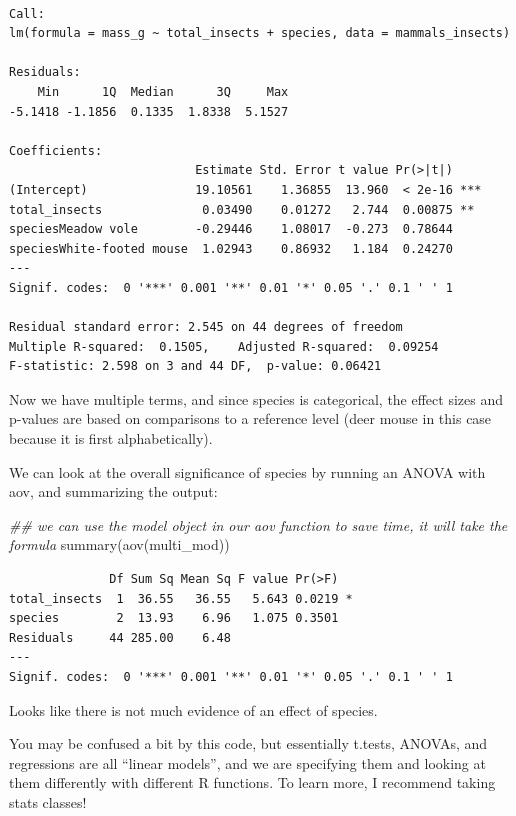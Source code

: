 \documentclass[
  letterpaper,
  DIV=11,
  numbers=noendperiod]{scrreprt}
\newenvironment{Shaded}{\begin{snugshade}}{\end{snugshade}}
\newcommand{\DocumentationTok}[1]{\textcolor[rgb]{0.37,0.37,0.37}{\textit{#1}}}
\newcommand{\FunctionTok}[1]{\textcolor[rgb]{0.28,0.35,0.67}{#1}}
\newcommand{\NormalTok}[1]{\textcolor[rgb]{0.00,0.23,0.31}{#1}}
\begin{document}
\begin{verbatim}

Call:
lm(formula = mass_g ~ total_insects + species, data = mammals_insects)

Residuals:
    Min      1Q  Median      3Q     Max 
-5.1418 -1.1856  0.1335  1.8338  5.1527 

Coefficients:
                          Estimate Std. Error t value Pr(>|t|)    
(Intercept)               19.10561    1.36855  13.960  < 2e-16 ***
total_insects              0.03490    0.01272   2.744  0.00875 ** 
speciesMeadow vole        -0.29446    1.08017  -0.273  0.78644    
speciesWhite-footed mouse  1.02943    0.86932   1.184  0.24270    
---
Signif. codes:  0 '***' 0.001 '**' 0.01 '*' 0.05 '.' 0.1 ' ' 1

Residual standard error: 2.545 on 44 degrees of freedom
Multiple R-squared:  0.1505,    Adjusted R-squared:  0.09254 
F-statistic: 2.598 on 3 and 44 DF,  p-value: 0.06421
\end{verbatim}

Now we have multiple terms, and since species is categorical, the effect
sizes and p-values are based on comparisons to a reference level (deer
mouse in this case because it is first alphabetically).

We can look at the overall significance of species by running an ANOVA
with aov, and summarizing the output:

\begin{Shaded}
\begin{Highlighting}[]
\DocumentationTok{\#\# we can use the model object in our aov function to save time, it will take the formula}
\FunctionTok{summary}\NormalTok{(}\FunctionTok{aov}\NormalTok{(multi\_mod))}
\end{Highlighting}
\end{Shaded}

\begin{verbatim}
              Df Sum Sq Mean Sq F value Pr(>F)  
total_insects  1  36.55   36.55   5.643 0.0219 *
species        2  13.93    6.96   1.075 0.3501  
Residuals     44 285.00    6.48                 
---
Signif. codes:  0 '***' 0.001 '**' 0.01 '*' 0.05 '.' 0.1 ' ' 1
\end{verbatim}

Looks like there is not much evidence of an effect of species.

You may be confused a bit by this code, but essentially t.tests, ANOVAs,
and regressions are all ``linear models'', and we are specifying them
and looking at them differently with different R functions. To learn
more, I recommend taking stats classes!
\end{document}
